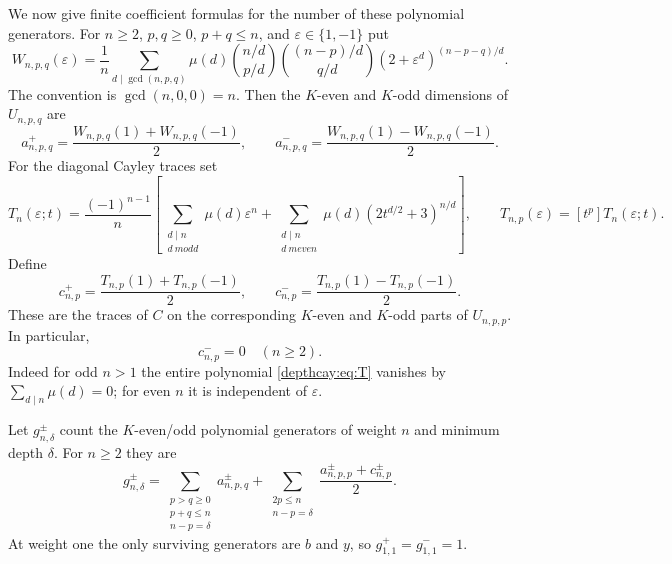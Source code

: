 \documentclass[11pt,a4paper]{article}
\numberwithin{equation}{section}
\theoremstyle{definition}
\theoremstyle{remark}
\begin{document}
We now give finite coefficient formulas for the number of these
polynomial generators. For $n\ge2$, $p,q\ge0$, $p+q\le n$, and
$\varepsilon\in\{1,-1\}$ put
\begin{equation}\label{depthcay:eq:W}
 W_{n,p,q}(\varepsilon)=\frac1n
 \sum_{d\mid\gcd(n,p,q)}\mu(d)
 \binom{n/d}{p/d}\binom{(n-p)/d}{q/d}
 (2+\varepsilon^d)^{(n-p-q)/d}.
\end{equation}
The convention is $\gcd(n,0,0)=n$.
Then the $K$-even and $K$-odd dimensions of $U_{n,p,q}$ are
\begin{equation}\label{depthcay:eq:a}
 a^+_{n,p,q}=\frac{W_{n,p,q}(1)+W_{n,p,q}(-1)}2,
 \qquad
 a^-_{n,p,q}=\frac{W_{n,p,q}(1)-W_{n,p,q}(-1)}2.
\end{equation}
For the diagonal Cayley traces set
\begin{equation}\label{depthcay:eq:T}
 T_n(\varepsilon;t)=\frac{(-1)^{n-1}}n
 \left[
 \sum_{\substack{d\mid n\\d\ {
m odd}}}\mu(d)\varepsilon^n
 +\sum_{\substack{d\mid n\\d\ {
m even}}}\mu(d)
       (2t^{d/2}+3)^{n/d}\right],
 \qquad T_{n,p}(\varepsilon)=[t^p]T_n(\varepsilon;t).
\end{equation}
Define
\[
 c^+_{n,p}=\frac{T_{n,p}(1)+T_{n,p}(-1)}2,\qquad
 c^-_{n,p}=\frac{T_{n,p}(1)-T_{n,p}(-1)}2.
\]
These are the traces of $C$ on the corresponding $K$-even and $K$-odd
parts of $U_{n,p,p}$. In particular,
\begin{equation}\label{depthcay:eq:oddtracezero}
 c^-_{n,p}=0\quad(n\ge2).
\end{equation}
Indeed for odd $n>1$ the entire polynomial \eqref{depthcay:eq:T}
vanishes by $\sum_{d\mid n}\mu(d)=0$; for even $n$ it is independent
of $\varepsilon$.

Let $g^\pm_{n,\delta}$ count the $K$-even/odd polynomial generators
of weight $n$ and minimum depth $\delta$. For $n\ge2$ they are
\begin{equation}\label{depthcay:eq:generators}
 g^\pm_{n,\delta}
 =\sum_{\substack{p>q\ge0\\p+q\le n\\n-p=\delta}}a^\pm_{n,p,q}
 +\sum_{\substack{2p\le n\\n-p=\delta}}
     \frac{a^\pm_{n,p,p}+c^\pm_{n,p}}2.
\end{equation}
At weight one the only surviving generators are $b$ and $y$, so
$g^+_{1,1}=g^-_{1,1}=1$.
\end{document}
